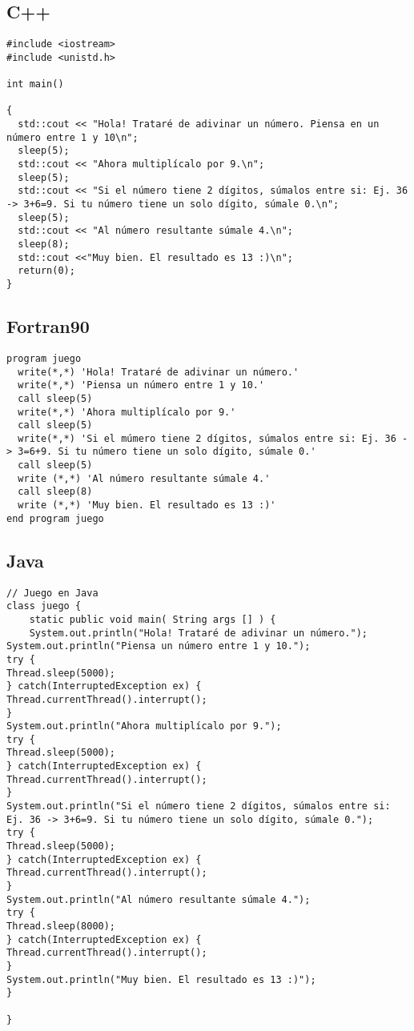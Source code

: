 \documentclass[10pt]{article}
\begin{document}
\subsection{C++}
\begin{verbatim}
#include <iostream>
#include <unistd.h>

int main()

{
  std::cout << "Hola! Trataré de adivinar un número. Piensa en un número entre 1 y 10\n";
  sleep(5);
  std::cout << "Ahora multiplícalo por 9.\n";
  sleep(5);
  std::cout << "Si el número tiene 2 dígitos, súmalos entre si: Ej. 36 -> 3+6=9. Si tu número tiene un solo dígito, súmale 0.\n";
  sleep(5);
  std::cout << "Al número resultante súmale 4.\n";
  sleep(8);
  std::cout <<"Muy bien. El resultado es 13 :)\n";
  return(0);
}

\end{verbatim}

\subsection{Fortran90}
\begin{verbatim}
program juego
  write(*,*) 'Hola! Trataré de adivinar un número.'
  write(*,*) 'Piensa un número entre 1 y 10.'
  call sleep(5)
  write(*,*) 'Ahora multiplícalo por 9.'
  call sleep(5)
  write(*,*) 'Si el múmero tiene 2 dígitos, súmalos entre si: Ej. 36 -> 3=6+9. Si tu número tiene un solo dígito, súmale 0.'
  call sleep(5)
  write (*,*) 'Al número resultante súmale 4.'
  call sleep(8)
  write (*,*) 'Muy bien. El resultado es 13 :)'
end program juego

\end{verbatim}

\subsection{Java}
\begin{verbatim}
// Juego en Java
class juego {
    static public void main( String args [] ) {
	System.out.println("Hola! Trataré de adivinar un número.");
System.out.println("Piensa un número entre 1 y 10.");
try { 
Thread.sleep(5000);
} catch(InterruptedException ex) {
Thread.currentThread().interrupt();
}
System.out.println("Ahora multiplícalo por 9.");
try {
Thread.sleep(5000);
} catch(InterruptedException ex) {
Thread.currentThread().interrupt();
}
System.out.println("Si el número tiene 2 dígitos, súmalos entre si: Ej. 36 -> 3+6=9. Si tu número tiene un solo dígito, súmale 0.");
try {
Thread.sleep(5000);
} catch(InterruptedException ex) {
Thread.currentThread().interrupt();
}
System.out.println("Al número resultante súmale 4.");
try {
Thread.sleep(8000);
} catch(InterruptedException ex) {
Thread.currentThread().interrupt();
}
System.out.println("Muy bien. El resultado es 13 :)");
}

}
\end{verbatim}
\end{document}
